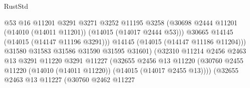 \begin{lexlean}{RustStd}
\begin{coremodule}
                                              @53
                                              @16
                                              @11201
                                              @3291
                                              @3271
                                              @3252
                                              @11195
                                              @3258
                                              (@30698
                                                @2444
                                                @11201
                                                (@14010 (@14011 @11201))
                                                (@14015 (@14017 @2444 @53)))
                                              @30665
                                              @14145
                                              (@14015 (@14147 @11196 @3291)))
                                            @14145
                                            (@14015 (@14147 @11186 @11204)))
                                          @31580
                                          @31583
                                          @31586
                                          @31590
                                          @31595
                                          @31601)
                                        (@32310
                                          @11214
                                          @2456
                                          @2463
                                          @13
                                          @3291
                                          @11220
                                          @3291
                                          @11227
                                          (@32655
                                            @2456
                                            @13
                                            @11220
                                            (@30760
                                              @2455
                                              @11220
                                              (@14010 (@14011 @11220))
                                              (@14015 (@14017 @2455 @13))))
                                          (@32655
                                            @2463
                                            @13
                                            @11227
                                            (@30760
                                              @2462
                                              @11227

\end{coremodule}
\end{lexlean}
